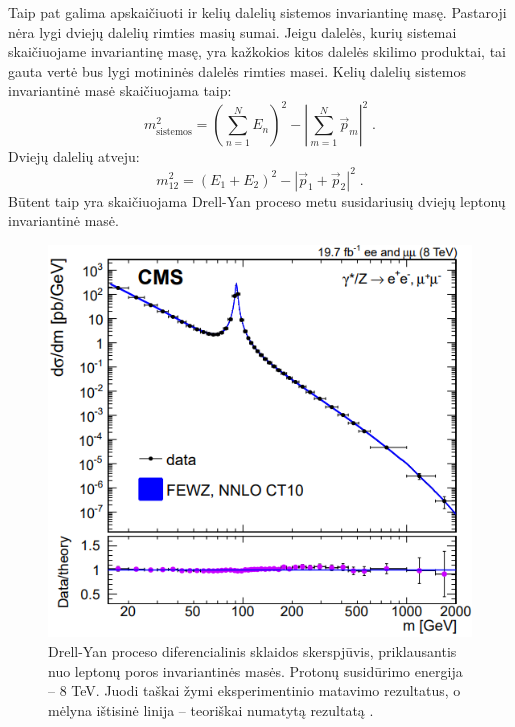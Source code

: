 \documentclass[a4paper, 12pt]{article}
\newlength\q
\begin{document}
Taip pat galima apskaičiuoti ir kelių dalelių sistemos invariantinę masę.
Pastaroji nėra lygi dviejų dalelių rimties masių sumai.
Jeigu dalelės, kurių sistemai skaičiuojame invariantinę masę, yra kažkokios kitos dalelės
skilimo produktai, tai gauta vertė bus lygi motininės dalelės rimties masei.
Kelių dalelių sistemos invariantinė masė skaičiuojama taip:
\begin{equation}
	m_{\mathrm{sistemos}}^{2} = \left( \sum_{n=1}^{N} E_{n} \right)^{2} -
	\left| \sum_{m=1}^{N} \vec{p}_{m} \right|^{2} \; .
	\label{eq:minvm}
\end{equation}
Dviejų dalelių atveju:
\begin{equation}
	m_{12}^2 = ( E_{1} + E_{2} )^{2} - | \vec{p}_{1} + \vec{p}_{2} |^{2} \; .
	\label{eq:tinvm}
\end{equation}
Būtent taip yra skaičiuojama Drell-Yan proceso metu susidariusių dviejų leptonų invariantinė masė.

\begin{centering}
\begin{figure}[H]
\centering
\includegraphics[scale=0.6]{DYeeCS.PNG}
\vspace{-0.2cm}
\caption{\label{fig:DYeeCS}
Drell-Yan proceso diferencialinis sklaidos skerspjūvis, priklausantis nuo leptonų poros invariantinės
masės.
Protonų susidūrimo energija -- $8$ TeV.
Juodi taškai žymi eksperimentinio matavimo rezultatus, o mėlyna ištisinė linija -- teoriškai numatytą
rezultatą \cite{DYpic}.
}
\end{figure}
\end{centering}
\end{document}
